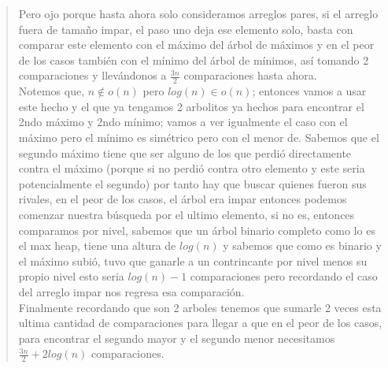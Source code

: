 \begin{quote}
    Pero ojo porque hasta ahora solo consideramos arreglos pares, si el arreglo fuera de tamaño impar, el paso uno deja ese elemento solo, basta con comparar este elemento con el máximo del árbol de máximos y en el peor de los casos también con el mínimo del árbol de mínimos, así tomando 2 comparaciones y llevándonos a $\frac{3n}{2}$ comparaciones hasta ahora.\\

    Notemos que, $n \not \in o(n)$ pero $log(n) \in o(n)$; entonces vamos a usar este hecho y el que ya tengamos 2 arbolitos ya hechos para encontrar el 2ndo máximo y 2ndo mínimo; vamos a ver igualmente el caso con el máximo pero el mínimo es simétrico pero con el menor de. Sabemos que el segundo máximo tiene que ser alguno de los que perdió directamente contra el máximo (porque si no perdió contra otro elemento y este seria potencialmente el segundo) por tanto hay que buscar quienes fueron sus rivales, en el peor de los casos, el árbol era impar entonces podemos comenzar nuestra búsqueda por el ultimo elemento, si no es, entonces comparamos por nivel, sabemos que un árbol binario completo como lo es el max heap, tiene una altura de $log(n)$ y sabemos que como es binario y el máximo subió, tuvo que ganarle a un contrincante por nivel menos su propio nivel esto seria $log(n)-1$ comparaciones pero recordando el caso del arreglo impar nos regresa esa comparación.\\

    Finalmente recordando que son 2 arboles tenemos que sumarle 2 veces esta ultima cantidad de comparaciones para llegar a que en el peor de los casos, para encontrar el segundo mayor y el segundo menor necesitamos $\frac{3n}{2} + 2log(n)$ comparaciones.\\
\end{quote}